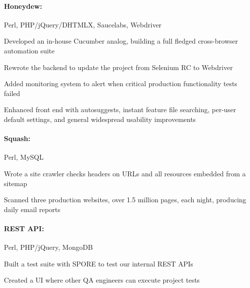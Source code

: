 \begin{position}

  \paragraph{Honeydew:} Perl, PHP/jQuery/DHTMLX, Saucelabs, Webdriver
  \begin{myitem}
  \item Developed an in-house Cucumber analog, building a full fledged cross-browser automation suite
  \item Rewrote the backend to update the project from Selenium RC to Webdriver
  \item Added monitoring system to alert when critical production functionality tests failed
  \item Enhanced front end with autosuggests, instant feature file searching, per-user default
    settings, and general widespread usability improvements
  \end{myitem}
%
%
  \paragraph{Squash:} Perl, MySQL
  \begin{myitem}
  \item Wrote a site crawler checks headers on URLs and all resources embedded from a sitemap
  \item Scanned three production websites, over 1.5 million pages,
    each night, producing daily email reports
  \end{myitem}
%
  \paragraph{REST API:} Perl, PHP/jQuery, MongoDB
  \begin{myitem}
  \item Built a test suite with SPORE to test our internal REST APIs
  \item Created a UI where other QA engineers can execute project tests
  \end{myitem}
%

\end{position}
